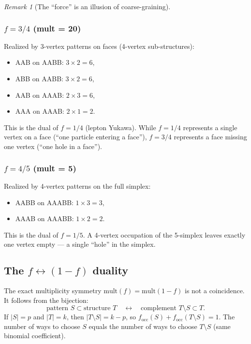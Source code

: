 \documentclass[12pt]{article}
\theoremstyle{remark}
\newtheorem{remark}[theorem]{Remark}
\theoremstyle{definition}
\begin{document}
\begin{remark}[The ``force'' is an illusion of coarse-graining]
\subsubsection{$f = 3/4$ (mult = 20)}

Realized by 3-vertex patterns on faces (4-vertex sub-structures):
\begin{itemize}
\item AAB on AABB: $3 \times 2 = 6$,
\item ABB on AABB: $3 \times 2 = 6$,
\item AAB on AAAB: $2 \times 3 = 6$,
\item AAA on AAAB: $2 \times 1 = 2$.
\end{itemize}
This is the dual of $f = 1/4$ (lepton Yukawa).  While $f = 1/4$ represents a single vertex on a face (``one particle entering a face''), $f = 3/4$ represents a face missing one vertex (``one hole in a face'').

\subsubsection{$f = 4/5$ (mult = 5)}

Realized by 4-vertex patterns on the full simplex:
\begin{itemize}
\item AABB on AAABB: $1 \times 3 = 3$,
\item AAAB on AAABB: $1 \times 2 = 2$.
\end{itemize}
This is the dual of $f = 1/5$.  A 4-vertex occupation of the 5-simplex leaves exactly one vertex empty --- a single ``hole'' in the simplex.

\subsection{The $f \leftrightarrow (1-f)$ duality}
\label{sec:f_duality}

The exact multiplicity symmetry $\mathrm{mult}(f) = \mathrm{mult}(1-f)$ is not a coincidence.  It follows from the bijection:
\begin{equation}
\text{pattern } S \subset \text{structure } T \quad \longleftrightarrow \quad \text{complement } T \setminus S \subset T.
\end{equation}
If $|S| = p$ and $|T| = k$, then $|T \setminus S| = k - p$, so $f_\mathrm{occ}(S) + f_\mathrm{occ}(T \setminus S) = 1$.  The number of ways to choose $S$ equals the number of ways to choose $T \setminus S$ (same binomial coefficient).


\end{remark}
\end{document}
